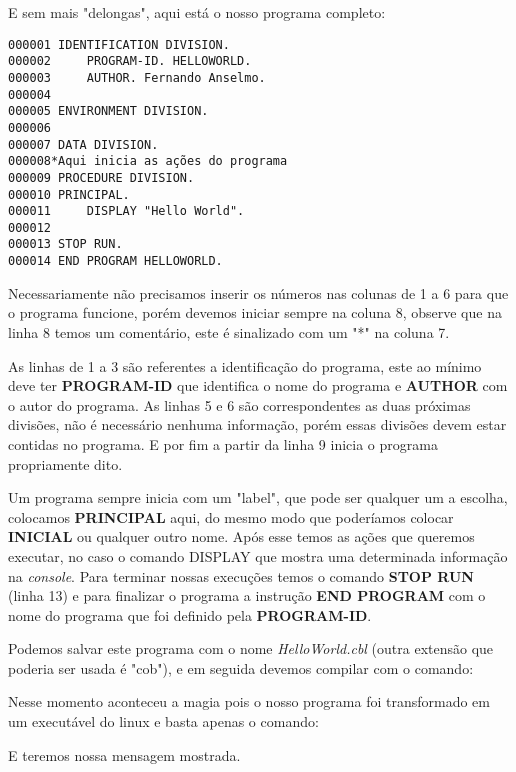 E sem mais "delongas", aqui está o nosso programa completo:
\begin{lstlisting}[]
000001 IDENTIFICATION DIVISION.
000002     PROGRAM-ID. HELLOWORLD.
000003     AUTHOR. Fernando Anselmo.
000004
000005 ENVIRONMENT DIVISION.
000006       
000007 DATA DIVISION.
000008*Aqui inicia as ações do programa    
000009 PROCEDURE DIVISION.
000010 PRINCIPAL.
000011     DISPLAY "Hello World".
000012
000013 STOP RUN.
000014 END PROGRAM HELLOWORLD.
\end{lstlisting}

Necessariamente não precisamos inserir os números nas colunas de 1 a 6 para que o programa funcione, porém devemos iniciar sempre na coluna 8, observe que na linha 8 temos um comentário, este é sinalizado com um "*" na coluna 7.

As linhas de 1 a 3 são referentes a identificação do programa, este ao mínimo deve ter \textbf{PROGRAM-ID} que identifica o nome do programa e \textbf{AUTHOR} com o autor do programa. As linhas 5 e 6 são correspondentes as duas próximas divisões, não é necessário nenhuma informação, porém essas divisões devem estar contidas no programa. E por fim a partir da linha 9 inicia o programa propriamente dito.

Um programa sempre inicia com um "label", que pode ser qualquer um a escolha, colocamos \textbf{PRINCIPAL} aqui, do mesmo modo que poderíamos colocar \textbf{INICIAL} ou qualquer outro nome. Após esse temos as ações que queremos executar, no caso o comando DISPLAY que mostra uma determinada informação na \textit{console}. Para terminar nossas execuções temos o comando \textbf{STOP RUN} (linha 13) e para finalizar o programa a instrução \textbf{END PROGRAM} com o nome do programa que foi definido pela \textbf{PROGRAM-ID}.

Podemos salvar este programa com o nome \textit{HelloWorld.cbl} (outra extensão que poderia ser usada é "cob"), e em seguida devemos compilar com o comando: \\

Nesse momento aconteceu a magia pois o nosso programa foi transformado em um executável do linux e basta apenas o comando: \\

E teremos nossa mensagem mostrada.

\clearpage